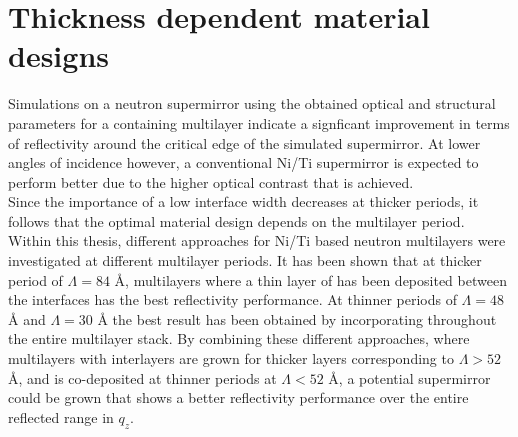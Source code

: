 \section{Thickness dependent material designs}
Simulations on a neutron supermirror using the obtained optical and structural parameters for a \BC containing multilayer indicate a signficant improvement in terms of reflectivity around the critical edge of the simulated supermirror. At lower angles of incidence however, a conventional Ni/Ti supermirror is expected to perform better due to the higher optical contrast that is achieved. \\
Since the importance of a low interface width decreases at thicker periods, it follows that the optimal material design depends on the multilayer period. Within this thesis, different approaches for Ni/Ti based neutron multilayers were investigated at different multilayer periods. It has been shown that at thicker period of $\Lambda = 84$ Å, multilayers where a thin layer of \BC has been deposited between the interfaces has the best reflectivity performance. At thinner periods of $\Lambda = 48$ Å and $\Lambda = 30$ Å the best result has been obtained by incorporating \BC throughout the entire multilayer stack. By combining these different approaches, where multilayers with \BC interlayers are grown for thicker layers corresponding to $\Lambda > 52$ Å, and \BC is co-deposited at thinner periods at $\Lambda < 52$ Å, a potential supermirror could be grown that shows a better reflectivity performance over the entire reflected range in $q_z$.
